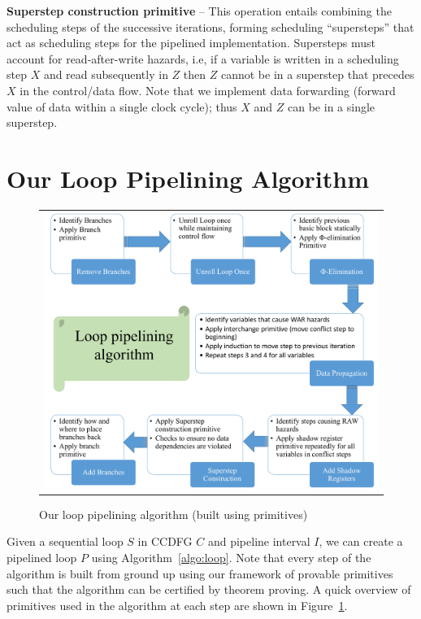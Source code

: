 {\textbf {Superstep construction primitive}} -- This operation entails combining the scheduling steps of the successive
iterations, forming scheduling ``supersteps'' that act as scheduling steps for the pipelined implementation. Supersteps must
account for read-after-write hazards, i.e, if a variable is written in a scheduling step $X$ and read subsequently in
$Z$ then $Z$ cannot be in a superstep that precedes $X$ in the control/data flow.  Note that we implement data
forwarding (forward value of data within a single clock cycle); thus $X$ and $Z$ can be in a single superstep.

\section{Our Loop Pipelining Algorithm}
\begin{figure}[t!]
\begin{center}
\begin{tabular}{c}
\includegraphics[width=5.5in]{fig-proposal/algorithm-using-primitives}
\end{tabular}
\end{center}
\caption{Our loop pipelining algorithm (built using primitives)}
\label{fig:algorithm-using-primitives}
\end{figure}

Given a sequential loop $S$ in CCDFG $C$ and pipeline interval $I$, we can create a pipelined loop $P$ using Algorithm~\ref{algo:loop}. Note that every step of the algorithm is built from ground up using our framework of provable primitives such that the algorithm can be certified by theorem proving. A quick overview of primitives used in the algorithm at each step are shown in Figure~\ref{fig:algorithm-using-primitives}.

